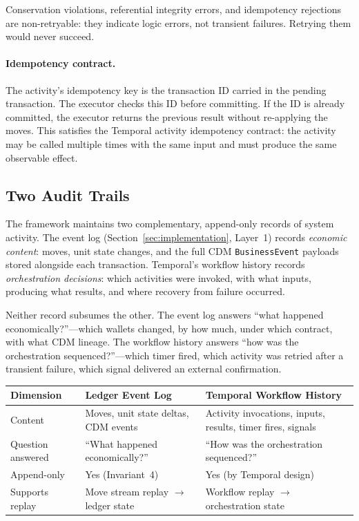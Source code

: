 \documentclass[11pt,a4paper]{article}
\begin{document}
\noindent Conservation violations, referential integrity errors, and idempotency rejections are non-retryable: they indicate logic errors, not transient failures. Retrying them would never succeed.

\paragraph{Idempotency contract.} The activity's idempotency key is the transaction ID carried in the pending transaction. The executor checks this ID before committing. If the ID is already committed, the executor returns the previous result without re-applying the moves. This satisfies the Temporal activity idempotency contract: the activity may be called multiple times with the same input and must produce the same observable effect.

\subsection{Two Audit Trails}
\label{sec:temporal-audit-trails}

The framework maintains two complementary, append-only records of system activity. The event log (Section~\ref{sec:implementation}, Layer~1) records \emph{economic content}: moves, unit state changes, and the full CDM \texttt{BusinessEvent} payloads stored alongside each transaction. Temporal's workflow history records \emph{orchestration decisions}: which activities were invoked, with what inputs, producing what results, and where recovery from failure occurred.

Neither record subsumes the other. The event log answers ``what happened economically?''---which wallets changed, by how much, under which contract, with what CDM lineage. The workflow history answers ``how was the orchestration sequenced?''---which timer fired, which activity was retried after a transient failure, which signal delivered an external confirmation.

\begin{center}
\small
\begin{tabular}{l p{5.5cm} p{5.5cm}}
\toprule
\textbf{Dimension} & \textbf{Ledger Event Log} & \textbf{Temporal Workflow History} \\
\midrule
Content & Moves, unit state deltas, CDM events & Activity invocations, inputs, results, timer fires, signals \\
Question answered & ``What happened economically?'' & ``How was the orchestration sequenced?'' \\
Append-only & Yes (Invariant~4) & Yes (by Temporal design) \\
Supports replay & Move stream replay $\to$ ledger state & Workflow replay $\to$ orchestration state \\
\bottomrule
\end{tabular}
\end{center}
\end{document}
